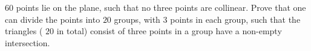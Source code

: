 $60$ points lie on the plane, such that no three points are collinear. Prove that one can divide the points into $20$ groups, with $3$ points in each group, such that the triangles ( $20$ in total) consist of three points in a group have a non-empty intersection.